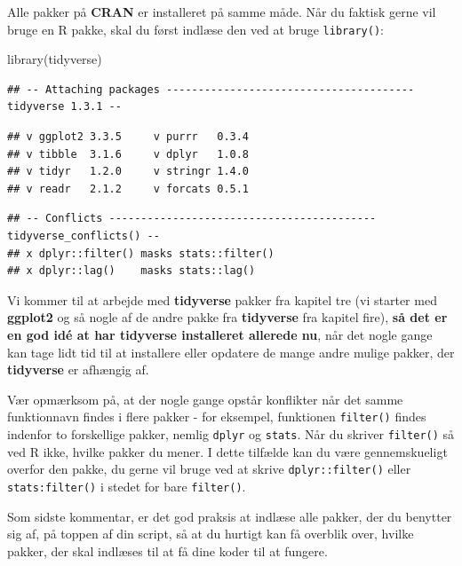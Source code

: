 \documentclass[
]{book}
\newenvironment{Shaded}{\begin{snugshade}}{\end{snugshade}}
\newcommand{\FunctionTok}[1]{\textcolor[rgb]{0.00,0.00,0.00}{#1}}
\newcommand{\NormalTok}[1]{#1}
\begin{document}
Alle pakker på \textbf{CRAN} er installeret på samme måde. Når du faktisk gerne vil bruge en R pakke, skal du først indlæse den ved at bruge \texttt{library()}:

\begin{Shaded}
\begin{Highlighting}[]
\FunctionTok{library}\NormalTok{(tidyverse)}
\end{Highlighting}
\end{Shaded}

\begin{verbatim}
## -- Attaching packages --------------------------------------- tidyverse 1.3.1 --
\end{verbatim}

\begin{verbatim}
## v ggplot2 3.3.5     v purrr   0.3.4
## v tibble  3.1.6     v dplyr   1.0.8
## v tidyr   1.2.0     v stringr 1.4.0
## v readr   2.1.2     v forcats 0.5.1
\end{verbatim}

\begin{verbatim}
## -- Conflicts ------------------------------------------ tidyverse_conflicts() --
## x dplyr::filter() masks stats::filter()
## x dplyr::lag()    masks stats::lag()
\end{verbatim}

Vi kommer til at arbejde med \textbf{tidyverse} pakker fra kapitel tre (vi starter med \textbf{ggplot2} og så nogle af de andre pakke fra \textbf{tidyverse} fra kapitel fire), \textbf{så det er en god idé at har tidyverse installeret allerede nu}, når det nogle gange kan tage lidt tid til at installere eller opdatere de mange andre mulige pakker, der \textbf{tidyverse} er afhængig af.

Vær opmærksom på, at der nogle gange opstår konflikter når det samme funktionnavn findes i flere pakker - for eksempel, funktionen \texttt{filter()} findes indenfor to forskellige pakker, nemlig \texttt{dplyr} og \texttt{stats}. Når du skriver \texttt{filter()} så ved R ikke, hvilke pakker du mener. I dette tilfælde kan du være gennemskueligt overfor den pakke, du gerne vil bruge ved at skrive \texttt{dplyr::filter()} eller \texttt{stats:filter()} i stedet for bare \texttt{filter()}.

Som sidste kommentar, er det god praksis at indlæse alle pakker, der du benytter sig af, på toppen af din script, så at du hurtigt kan få overblik over, hvilke pakker, der skal indlæses til at få dine koder til at fungere.
\end{document}
